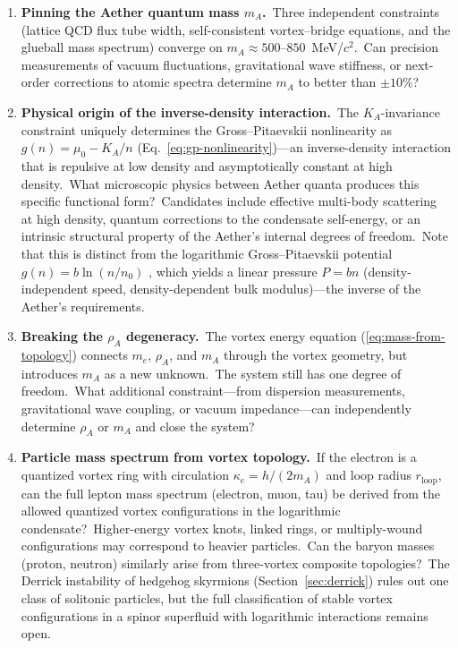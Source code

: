 ﻿\documentclass[12pt,letterpaper]{article}
\newcommand{\rhoa}{\rho_{\!A}}
\newcommand{\Ka}{K_{\!A}}
\begin{document}
\begin{enumerate}[leftmargin=2em]
  \item \textbf{Pinning the Aether quantum mass $m_A$.}\ Three independent
    constraints (lattice QCD flux tube width, self-consistent vortex--bridge
    equations, and the glueball mass spectrum) converge on
    $m_A \approx 500$--$850$~MeV/$c^2$.\ Can precision measurements of vacuum
    fluctuations, gravitational wave stiffness, or next-order corrections to
    atomic spectra determine $m_A$ to better than $\pm 10\%$?

  \item \label{item:log-eos-micro}\textbf{Physical origin of the
    inverse-density interaction.}\ The $\Ka$-invariance constraint uniquely
    determines the Gross--Pitaevskii nonlinearity as $g(n) = \mu_0 - \Ka/n$
    (Eq.~\ref{eq:gp-nonlinearity})---an inverse-density interaction that is
    repulsive at low density and asymptotically constant at high density.\
    What microscopic physics between Aether quanta produces this specific
    functional form?\ Candidates include effective multi-body scattering
    at high density, quantum corrections to the condensate self-energy,
    or an intrinsic structural property of the Aether's internal degrees
    of freedom.\ Note that this is distinct from the logarithmic
    Gross--Pitaevskii potential $g(n) = b\ln(n/n_0)$
    \cite{rosen1969,zloshchastiev2011}, which yields a linear pressure
    $P = bn$ (density-independent speed, density-dependent bulk modulus)---the
    inverse of the Aether's requirements.

  \item \textbf{Breaking the $\rhoa$ degeneracy.}\ The vortex energy equation
    (\ref{eq:mass-from-topology}) connects $m_e$, $\rhoa$, and $m_A$ through
    the vortex geometry, but introduces $m_A$ as a new unknown.\ The system
    still has one degree of freedom.\ What additional constraint---from
    dispersion measurements, gravitational wave coupling, or vacuum
    impedance---can independently determine $\rhoa$ or $m_A$ and close the
    system?

  \item \textbf{Particle mass spectrum from vortex topology.}\ If the electron
    is a quantized vortex ring with circulation $\kappa_e = h/(2m_A)$ and loop
    radius $r_{\mathrm{loop}}$, can the full lepton mass spectrum (electron,
    muon, tau) be derived from the allowed quantized vortex configurations in
    the logarithmic condensate?\ Higher-energy vortex knots, linked rings, or
    multiply-wound configurations may correspond to heavier particles.\ Can the
    baryon masses (proton, neutron) similarly arise from three-vortex composite
    topologies?\ The Derrick instability of hedgehog skyrmions
    (Section~\ref{sec:derrick}) rules out one class of solitonic particles, but
    the full classification of stable vortex configurations in a spinor
    superfluid with logarithmic interactions remains open.


\end{enumerate}
\end{document}
